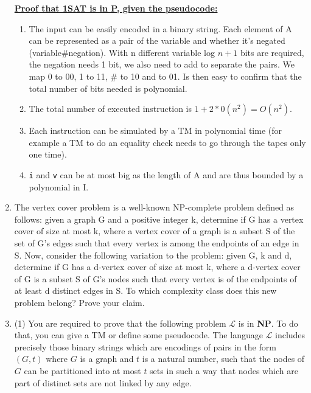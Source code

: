 \documentclass{article}
\begin{document}
\begin{enumerate}[label=\textbf{\arabic*.}, leftmargin=*]
\begin{pane}
					\textbf{\uline{Proof that 1SAT is in P, given the pseudocode:}}
					\begin{enumerate}[label=\arabic*., leftmargin=*]
						\item The input can be easily encoded in a binary string. Each element of A can be represented as a pair of the variable and whether it's negated (variable\#negation). With n different variable log $n + 1$ bits are required, the negation needs 1 bit, we also need to add \@ to separate the pairs. We map 0 to 00, 1 to 11, \# to 10 and \@ to 01. Is then easy to confirm that the total number of bits needed is polynomial.
						\item The total number of executed instruction is $1 + 2*0(n^2) = O(n^2)$.
						\item Each instruction can be simulated by a TM in polynomial time (for example a TM to do an equality check needs to go through the tapes only one time).
						\item \texttt{i} and \texttt{v} can be at most big as the length of A and are thus bounded by a polynomial in I.
					\end{enumerate}
				\end{pane}
				\item The vertex cover problem is a well-known NP-complete problem defined as follows: given a graph G and a positive integer k, determine if G has a vertex cover of size at most k, where a vertex cover of a graph is a subset S of the set of G's edges such that every vertex is among the endpoints of an edge in S. Now, consider the following variation to the problem: given G, k and d, determine if G has a d-vertex cover of size at most k, where a d-vertex cover of G is a subset S of G's nodes such that every vertex is of the endpoints of at least d distinct edges in S. To which complexity class does this new problem belong? Prove your claim.
				\begin{pane}
						
				\end{pane}
				\item (1) You are required to prove that the following problem $\mathcal{L}$ is in \textbf{NP}. To do that, you can give a TM or define some pseudocode. The language $\mathcal{L}$ includes precisely those binary strings which are encodings of pairs in the form $(G, t)$ where $G$ is a graph and $t$ is a natural number, such that the nodes of $G$ can be partitioned into at most $t$ sets in such a way that nodes which are part of distinct sets are not linked by any edge.\\
				

\end{enumerate}
\end{document}
